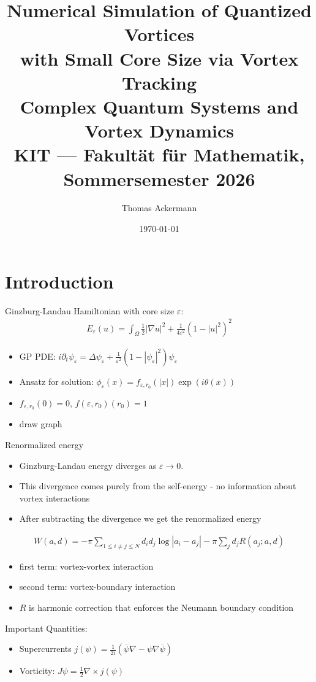 \documentclass[12pt, a4paper]{article}
\title{
  \Large\textbf{Numerical Simulation of Quantized Vortices\\
  with Small Core Size via Vortex Tracking}\\[0.5em]
  \large Complex Quantum Systems and Vortex Dynamics\\
  KIT --- Fakultät für Mathematik, Sommersemester 2026
}
\author{Thomas Ackermann}
\date{\today}
\theoremstyle{plain}
\theoremstyle{definition}
\newcommand{\psieps}{\psi_\varepsilon}
\begin{document}
\maketitle
\thispagestyle{empty}

\section{Introduction}

Ginzburg-Landau Hamiltonian with core size $\varepsilon$:
\begin{align}
    E_\varepsilon (u) = \int_\Omega \frac{1}{2} |\nabla u|^2 + \frac{1}{4 \varepsilon^2} (1- |u|^2)^2
\end{align}
\begin{itemize}
    \item GP PDE: $i \partial_t \psieps = \Delta \psieps + \frac{1}{\varepsilon^2} (1 - |\psieps|^2) \psieps$
    \item Ansatz for solution: $\phi_\varepsilon (x) = f_{\varepsilon, r_0} (|x|) \exp (i \theta(x))$
    \item $f_{\varepsilon, r_0}(0) = 0$, $f(\varepsilon, r_0) (r_0)= 1$
    \item draw graph
\end{itemize}
Renormalized energy
\begin{itemize}
    \item Ginzburg-Landau energy diverges as $\varepsilon \to 0$.
    \item This divergence comes purely from the self-energy - no information about vortex interactions
    \item After subtracting the divergence we get the renormalized energy
\end{itemize}

\begin{align}
  W(a,d) =  - \pi \sum_{1 \leq i \neq j \leq N} d_i d_j \log |a_i - a_j| - \pi \sum_j d_j R(a_j ; a, d)
\end{align}
\begin{itemize}
    \item first term: vortex-vortex interaction
    \item second term: vortex-boundary interaction
    \item $R$ is harmonic correction that enforces the Neumann boundary condition
\end{itemize}

Important Quantities:
\begin{itemize}
  \item Supercurrents $j(\psi) = \frac{1}{2i}(\overline{\psi} \nabla - \psi \nabla \overline{\psi})$
  \item Vorticity: $J \psi = \frac{1}{2} \nabla \times j(\psi)$
\end{itemize}
\end{document}
